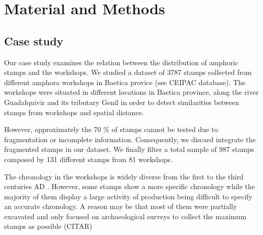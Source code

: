 \documentclass[review]{elsarticle}
\begin{document}
\section{Material and Methods}

\subsection{Case study}

Our case study examines the relation between the distribution of amphoric stamps and the workshops. We studied a dataset of 3787 stamps collected from different amphora workshops in Baetica provice (see CEIPAC database). The workshops were situated in different locations in Baetica province, along the river Guadalquivir and its tributary Genil in order to detect similarities between stamps from workshops and spatial distance. 

However, approximately the 70 \% of stamps cannot be tested due to fragmentation or incomplete information. Consequently, we discard integrate the fragmented stamps in our dataset. We finally filter a total sample of 987 stamps composed by 131 different stamps from 81 workshops. 

The chronology in the workshops is widely diverse from the first to the third centuries AD \citep{garcia_vargas_enrique_formal_2010}. However, some stamps show a more specific chronology while the majority of them display a large activity of production being difficult to specify an accurate chronology. A reason may be that most of them were partially excavated and only focused on archaeological surveys to collect the maximum stamps as possible (CITAR) 


\end{document}
